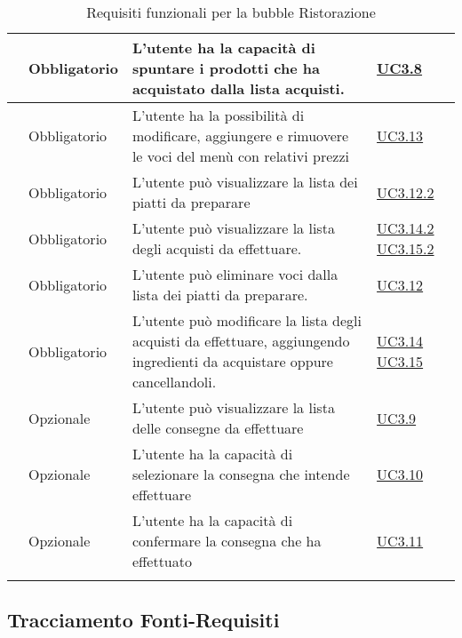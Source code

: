 \begin{longtable}{|P{1.5cm}|P{2.5cm}|P{6.5cm}|P{2.5cm}|}
	\hline \RequisitoObF\label{L28} & Obbligatorio & L'utente  ha la capacità di spuntare i prodotti che ha acquistato dalla lista acquisti.
	 & \hyperref[UC3.8]{UC3.8} \\
	\hline \RequisitoObF\label{L29} & Obbligatorio & L'utente  ha la possibilità di modificare, aggiungere e rimuovere le voci del menù con relativi prezzi & \hyperref[UC3.13]{UC3.13} \\
	\hline \RequisitoObF\label{L30} & Obbligatorio & L'utente  può visualizzare la lista dei piatti da preparare & \hyperref[UC3.12.2]{UC3.12.2} \\
	\hline \RequisitoObF\label{L31} & Obbligatorio & L'utente  può visualizzare la lista degli acquisti da effettuare. & \hyperref[UC3.14.2]{UC3.14.2} \hyperref[UC3.15.2]{UC3.15.2} \\
	\hline \RequisitoObF\label{L32} & Obbligatorio & L'utente  può eliminare voci dalla lista dei piatti da preparare. & \hyperref[UC3.12]{UC3.12} \\
	\hline \RequisitoObF\label{L53} & Obbligatorio & L'utente  può modificare la lista degli acquisti da effettuare, aggiungendo ingredienti da acquistare oppure cancellandoli.
	 & \hyperref[UC3.14]{UC3.14} \linebreak \hyperref[UC3.15]{UC3.15} \\	 
	\hline \RequisitoOpF\label{L50} & Opzionale & L'utente  può visualizzare la lista delle consegne da effettuare & \hyperref[UC3.9]{UC3.9} \\
	\hline \RequisitoOpF\label{L51} & Opzionale & L'utente  ha la capacità di selezionare la consegna che intende effettuare & \hyperref[UC3.10]{UC3.10} \\
	\hline \RequisitoOpF\label{L52} & Opzionale & L'utente  ha la capacità di confermare la consegna che ha effettuato & \hyperref[UC3.11]{UC3.11} \\
	\hline
	\caption{Requisiti funzionali per la bubble Ristorazione}
\end{longtable}

\subsection{Tracciamento Fonti-Requisiti}

